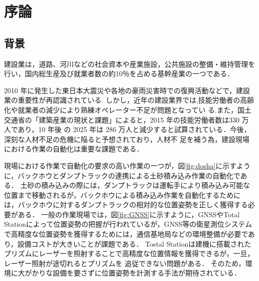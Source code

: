 \chapter{序論}
\thispagestyle{empty}
\label{Chap1}
\minitoc

\newpage

\section{背景}
\label{Background}
建設業は，道路、河川などの社会資本や産業施設，公共施設の整備・維持管理を行い，国内総生産及び就業者数の約10％を占める基幹産業の一つである．
\par 2010 年に発生した東日本大震災や各地の豪雨災害時での復興活動などで，建設業の重要性が再認識されている.
しかし，近年の建設業界では,技能労働者の高齢化や就業者の減少により熟練オペレーター不足が問題となってい
る.また，国土交通省の「建築産業の現状と課題」\cite{建設経済研究所2017}によると，2015 年の技能労働者数は330 万人であり，10 年後
の 2025 年は 286 万人と減少すると試算されている．今後，深刻な人材不足の危機に陥ると予想されており，人材不
足を補う為，建設現場における作業の自動化は重要な課題である．
\newpage
\par
現場における作業で自動化の要求の高い作業の一つが，図\ref{fig:dosha}に示すように，バックホウとダンプトラックの連携による土砂積み込み作業の自動化である．
土砂の積み込みの際には，ダンプトラックは運転手により積み込み可能な位置まで移動されるが，バックホウによる積み込み作業を自動化するために
は，バックホウに対するダンプトラックの相対的な位置姿勢を正しく獲得する必要がある．
一般の作業現場では，図\ref{fig:GNSS}に示すように，GNSSやTotal Stationによって位置姿勢の把握\cite{土井下2010}が行われているが，GNSS等の衛星測位システムで高精度な位置姿勢を獲得するためには，通信基地局などの環境整備が必要であり，設備コストが大きいことが課題である．
Tostal Stationは建機に搭載されたプリズムにレーザーを照射することで高精度な位置情報を獲得できるが，一旦，レーザー照射が途切れるとプリズムを
追従できない問題がある．
そのため，環境に大がかりな設備を要さずに位置姿勢を計測する手法が期待されている．

